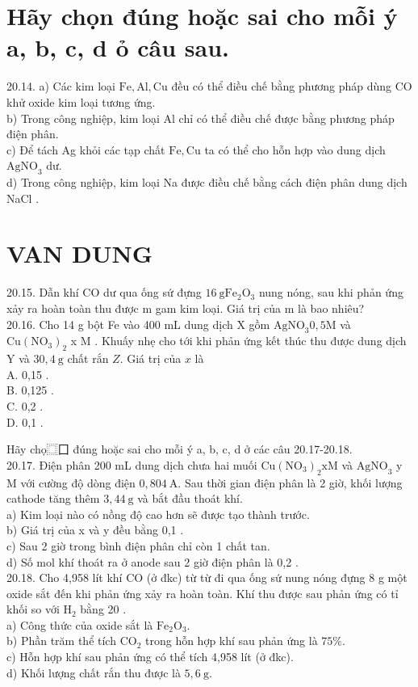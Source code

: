 \documentclass[10pt]{article}
\begin{document}
\section*{Hãy chọn đúng hoặc sai cho mỗi ý a, b, c, d ỏ câu sau.}
20.14. a) Các kim loại $\mathrm{Fe}, \mathrm{Al}, \mathrm{Cu}$ đều có thể điều chế bằng phương pháp dùng CO khử oxide kim loại tương ứng.\\
b) Trong công nghiệp, kim loại Al chỉ có thể điều chế được bằng phương pháp điện phân.\\
c) Để tách Ag khỏi các tạp chất $\mathrm{Fe}, \mathrm{Cu}$ ta có thể cho hỗn hợp vào dung dịch $\mathrm{AgNO}_{3}$ dư.\\
d) Trong công nghiệp, kim loại Na được điều chế bằng cách điện phân dung dịch NaCl .

\section*{VAN DUNG}
20.15. Dẫn khí CO dư qua ống sứ đựng $16 \mathrm{~g} \mathrm{Fe}_{2} \mathrm{O}_{3}$ nung nóng, sau khi phản ứng xảy ra hoàn toàn thu được m gam kim loại. Giá trị của m là bao nhiêu?\\
20.16. Cho 14 g bột Fe vào 400 mL dung dịch X gồm $\mathrm{AgNO}_{3} 0,5 \mathrm{M}$ và $\mathrm{Cu}\left(\mathrm{NO}_{3}\right)_{2}$ x M . Khuấy nhẹ cho tới khi phản ứng kết thúc thu được dung dịch Y và $30,4 \mathrm{~g}$ chất rắn $Z$. Giá trị của $x$ là\\
A. 0,15 .\\
B. 0,125 .\\
C. 0,2 .\\
D. 0,1 .

Hãy chọ⿴囗 đúng hoặc sai cho mỗi ý a, b, c, d ở các câu 20.17-20.18.\\
20.17. Điện phân 200 mL dung dịch chưa hai muối $\mathrm{Cu}\left(\mathrm{NO}_{3}\right)_{2} \mathrm{x} \mathrm{M}$ và $\mathrm{AgNO}_{3}$ y M với cường độ dòng điện $0,804 \mathrm{~A}$. Sau thời gian điện phân là 2 giờ, khối lượng cathode tăng thêm $3,44 \mathrm{~g}$ và bắt đầu thoát khí.\\
a) Kim loại nào có nồng độ cao hơn sẽ được tạo thành trước.\\
b) Giá trị của x và y đều bằng 0,1 .\\
c) Sau 2 giờ trong bình điện phân chỉ còn 1 chất tan.\\
d) Số mol khí thoát ra ở anode sau 2 giờ điện phân là 0,2 .\\
20.18. Cho 4,958 lít khí CO (ở đkc) từ từ đi qua ống sứ nung nóng đựng 8 g một oxide sắt đến khi phản ứng xảy ra hoàn toàn. Khí thu được sau phản ứng có tỉ khối so với $\mathrm{H}_{2}$ bằng 20 .\\
a) Công thức của oxide sắt là $\mathrm{Fe}_{2} \mathrm{O}_{3}$.\\
b) Phần trăm thể tích $\mathrm{CO}_{2}$ trong hỗn hợp khí sau phản ứng là $75 \%$.\\
c) Hỗn hợp khí sau phản ứng có thể tích 4,958 lít (ở đkc).\\
d) Khối lượng chất rắn thu được là $5,6 \mathrm{~g}$.
\end{document}
